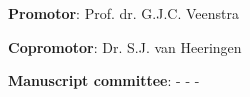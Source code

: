 \newpage

{\parindent0pt
\textbf{Promotor}:\newline
Prof. dr. G.J.C. Veenstra
\vspace{0.5cm}

\textbf{Copromotor}:\newline
Dr. S.J. van Heeringen
\vspace{0.5cm}

\textbf{Manuscript committee}:\newline
- \newline
- \newline
- \newline
}
\newpage

\setcounter{tocdepth}{0}
\tableofcontents
